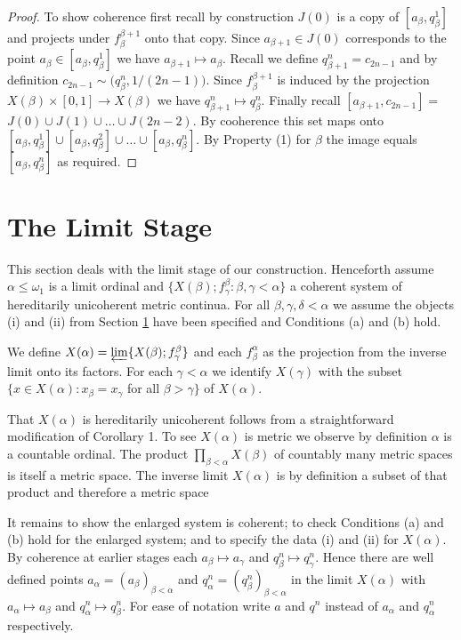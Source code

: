 \documentclass[12pt]{article}
\theoremstyle{plain}
\theoremstyle{definition}
\newcommand{\A}{\ensuremath{\alpha}}
\newcommand{\B}{\ensuremath{\beta}}
\newcommand{\W}{\ensuremath{\omega}}
\newcommand{\G}{\ensuremath{\gamma}}
\newcommand{\D}{\ensuremath{\delta}}
\newcommand{\NN}{\ensuremath{\mathbb N}}
\newcommand{\0}{\ensuremath{\varnothing}}
\begin{document}
\begin{proof}
		To show coherence first recall by construction $J(0)$ is a copy of $[a_\B,q^1_\B]$ and projects under $f^{\B+1}_\B$ onto that copy. Since $a_{\B+1} \in J(0)$ corresponds to the point $a_\B \in [a_\B,q^1_\B]$ we have $a_{\B+1} \mapsto a_\B$. 
		Recall we define $q^n_{\B+1} = c_{2n-1}$ and by definition $c_{2n-1} \sim \big (q^n_\B, 1/(2n-1) \big )$. Since $f^{\B+1}_\B$ is induced by the projection $X(\B) \times [0,1] \to X(\B)$ we have $q^n_{\B+1} \mapsto q^n_{\B} $. 
		Finally recall $[a_{\B+1}, c_{2n-1}] = $ $J(0) \cup J(1) \cup \ldots \cup J(2n-2)$. By cooherence this set maps onto $[a_\B,q^1_\B] \cup [a_\B,q^2_\B] \cup \ldots \cup [a_\B,q^n_\B]$. By Property (1) for $\B$ the image equals $[a_\B,q^n_\B]$ as required.
	\end{proof}
	
	
	
	\section{The Limit Stage}\label{5.4}
	
	\noindent
	This section deals with the limit stage of our construction. Henceforth assume $\A \le \W_1$ is a limit ordinal and \mbox{$\{X(\B); f^\B_\G : \B,\G< \A\}$} a coherent system of hereditarily unicoherent metric continua. For all $\B,\G,\D < \A$ we assume the objects (i) and (ii) from Section \ref{5.4} have been specified and Conditions (a) and (b) hold.
	
	We define  $X(\A) = \varprojlim \{X(\B); f^\B_\G\}$ and each $f^\A_\B$ as the projection from the inverse limit onto its factors. For each $\G<\A$ we identify  $X(\G)$ with the subset $\big \{x\in X(\A): x_\B = x_\G$ for all $\B > \G \big \}$ of $X(\A)$. 
	
	That $X(\A)$ is hereditarily unicoherent follows from a straightforward modification of \cite{HULimits} Corollary 1. To see $X(\A)$ is metric we observe by definition $\A$ is a countable ordinal. %
	The product $\prod_{\B < \A} X(\B)$ of countably many metric spaces is itself a metric space. The inverse limit $X(\A)$ is by definition a subset of that product and therefore a metric space 
	
	It remains to show the enlarged system is coherent; to check Conditions (a) and (b) hold for the enlarged system; and to specify the data (i) and (ii) for $X(\A)$. By coherence at earlier stages each $a_\B \mapsto a_\G$ and $q^n_\B \mapsto q^{n}_\G$. Hence there are well defined points $a_\A = (a_\B)_{\B<\A}$ and $q^n_\A = (q^n_\B)_{\B<\A}$ in the limit $X(\A)$ with $a_\A \mapsto a_\B$ and $q^n_\A \mapsto q^n_\B$. For ease of notation write $a$ and $q^n$ instead of $a_\A$ and $q^n_\A$ respectively.
	
\end{document}
